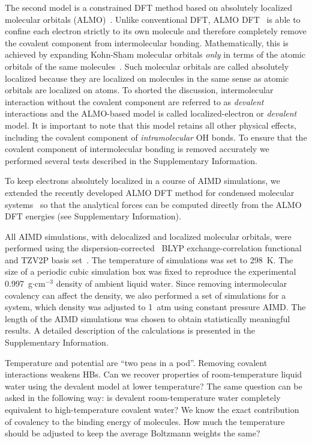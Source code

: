 \documentclass[prl,twocolumn,showpacs]{revtex4}
\begin{document}
The second model is a constrained DFT method based on absolutely localized molecular orbitals (ALMO)~\cite{khaliullin2006efficient}. Unlike conventional DFT, ALMO DFT~\cite{Khaliullin2013JCTC} is able to confine each electron strictly to its own molecule and therefore completely remove the covalent component from intermolecular bonding. Mathematically, this is achieved by expanding Kohn-Sham molecular orbitals \emph{only} in terms of the atomic orbitals of the same molecules~\cite{gian,khaliullin2006efficient, blw}. Such molecular orbitals are called absolutely localized because they are localized on molecules in the same sense as atomic orbitals are localized on atoms. To shorted the discussion, intermolecular interaction without the covalent component are referred to as \emph{devalent} interactions and the ALMO-based model is called localized-electron or \emph{devalent} model. It is important to note that this model retains all other physical effects, including the covalent component of \emph{intramolecular} OH bonds. %
To ensure that the covalent component of intermolecular bonding is removed accurately we performed several tests described in the Supplementary Information.

To keep electrons absolutely localized in a course of AIMD simulations, we extended the recently developed ALMO DFT method for  condensed molecular systems~\cite{Khaliullin2013JCTC} so that the analytical forces can be computed directly from the ALMO DFT energies (see Supplementary Information). 

All AIMD simulations, with delocalized and localized molecular orbitals, were performed using the dispersion-corrected~\cite{ZZZ} BLYP exchange-correlation functional~\cite{ZZZ} and TZV2P basis set~\cite{ZZZ}. The temperature of simulations was set to 298~K. The size of a periodic cubic simulation box was fixed to reproduce the experimental 0.997~g$\cdot$cm$^{-3}$ density of ambient liquid water. Since removing intermolecular covalency can affect the density, we also performed a set of simulations for a system, which density was adjusted to 1~atm using constant pressure AIMD. The length of the AIMD simulations was chosen to obtain statistically meaningful results. A detailed description of the calculations is presented in the Supplementary Information.

\new Temperature and potential are ``two peas in a pod''. Removing covalent interactions weakens HBs. Can we recover properties of room-temperature liquid water using the devalent model at lower temperature? The same question can be asked in the following way: is devalent room-temperature water completely equivalent to high-temperature covalent water? We know the exact contribution of covalency to the binding energy of molecules. How much the temperature should be adjusted to keep the average Boltzmann weights the same?\old
\end{document}

